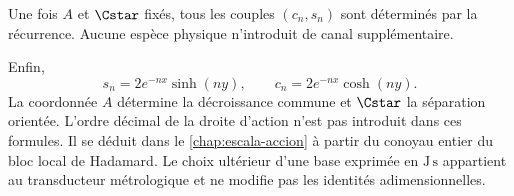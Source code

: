 \begin{corollary}
Une fois \(A\) et \(\Cstar\) fixés, tous les couples \((c_n,s_n)\) sont
déterminés par la récurrence. Aucune espèce physique n'introduit de canal
supplémentaire.
\end{corollary}

Enfin,
\[
 s_n=2e^{-nx}\sinh(ny),
 \qquad
 c_n=2e^{-nx}\cosh(ny).
\]
La coordonnée \(A\) détermine la décroissance commune et \(\Cstar\) la séparation
orientée. L'ordre décimal de la droite d'action n'est pas introduit dans ces
formules. Il se déduit dans le \cref{chap:escala-accion} à partir du conoyau
entier du bloc local de Hadamard. Le choix ultérieur d'une base
exprimée en \(\mathrm{J\,s}\) appartient au transducteur métrologique et ne
modifie pas les identités adimensionnelles.

